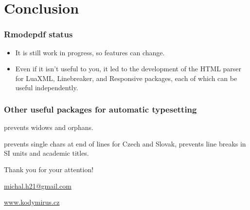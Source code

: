 \section{Conclusion}


\begin{frame}[fragile]
  \frametitle{Rmodepdf status}

  \begin{itemize}
    \item It is still work in progress, so features can change.
    \item Even if it isn't useful to you, it led to the development of the HTML parser for LuaXML, Linebreaker, and Responsive packages, each of which can be useful independently.
  \end{itemize}

\end{frame}

\begin{frame}[fragile]
  \frametitle{Other useful packages for automatic typesetting}
  \begin{description}
    \item[lua-widow-control] prevents widows and orphans.
    \item[luavlna]  prevents single chars at end of lines for Czech and Slovak, prevents line breaks in SI units and academic titles.
  \end{description}
\end{frame}





\begin{frame}[standout]
  Thank you for your attention!

  \url{michal.h21@gmail.com}

  \url{www.kodymirus.cz}
\end{frame}


